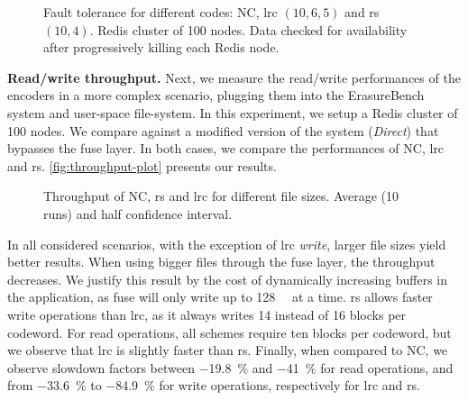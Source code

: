 \begin{table}
    \centering
    \caption{Encoding throughput of the different encoders in \si{\mega\byte\per\second}}
    
    \label{table:codes-performance-table}
\end{table}

\begin{figure}[ht]
    \centering
    
    \caption{Fault tolerance for different codes: NC, \ac{lrc} $\left(10,6,5\right)$ and \ac{rs} $\left(10,4\right)$. Redis cluster of 100 nodes. Data checked for availability after progressively killing each Redis node.}
    \label{fig:checksum-plot}
\end{figure}


\textbf{Read/write throughput.}
Next, we measure the read/write performances of the encoders in a more complex scenario, plugging them into the ErasureBench system and user-space file-system.
In this experiment, we setup a Redis cluster of 100 nodes.
We compare against a modified version of the system (\textit{Direct}) that bypasses the \ac{fuse} layer.
In both cases, we compare the performances of NC, \ac{lrc} and \ac{rs}. %
\autoref{fig:throughput-plot} presents our results.
\begin{figure*}[t]
    \centering
    
	\vspace{-2mm}	
    \caption{Throughput of NC, \ac{rs} and \ac{lrc} for different file sizes. Average (10 runs) and half confidence interval.}
    \label{fig:throughput-plot}
	\vspace{-2mm}
\end{figure*}
In all considered scenarios, with the exception of \ac{lrc} \textit{write}, larger file sizes yield better results.
When using bigger files through the \ac{fuse} layer, the throughput decreases.
We justify this result by the cost of dynamically increasing buffers in the application, as \ac{fuse} will only write up to \SI{128}{\kibi\byte} at a time.
\ac{rs} allows faster write operations than \ac{lrc}, as it always writes 14 instead of 16 blocks per codeword.
For read operations, all schemes require ten blocks per codeword, but we observe that \ac{lrc} is slightly faster than \ac{rs}.  
Finally, when compared to NC, we observe slowdown factors between \SI{-19.8}{\percent} and \SI{-41}{\percent} for read operations, and from \SI{-33.6}{\percent} to \SI{-84.9}{\percent} for write operations, respectively for \ac{lrc} and \ac{rs}.



